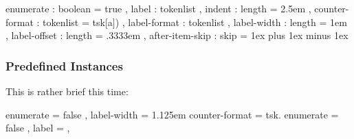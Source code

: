 \documentclass[DIV9,toc=index,toc=bib,numbers=noendperiod]{cnpkgdoc}
\begin{document}
\begin{beispiel}
  {
    enumerate       : boolean   = true    ,
    label           : tokenlist           ,
    indent          : length    = 2.5em   ,
    counter-format  : tokenlist = tsk[a]) ,
    label-format    : tokenlist           ,
    label-width     : length    = 1em     ,
    label-offset    : length    = .3333em ,
    after-item-skip : skip      = 1ex plus 1ex minus 1ex
  }
\end{beispiel}

\subsubsection{Predefined Instances}
This is rather brief this time:
\begin{beispiel}
   {
     enumerate   = false ,
     label-width = 1.125em
   }
   { counter-format = tsk. }
   {
     enumerate = false       ,
     label     = \choicebox  ,
   }
\end{beispiel}

\printindex
\end{document}
